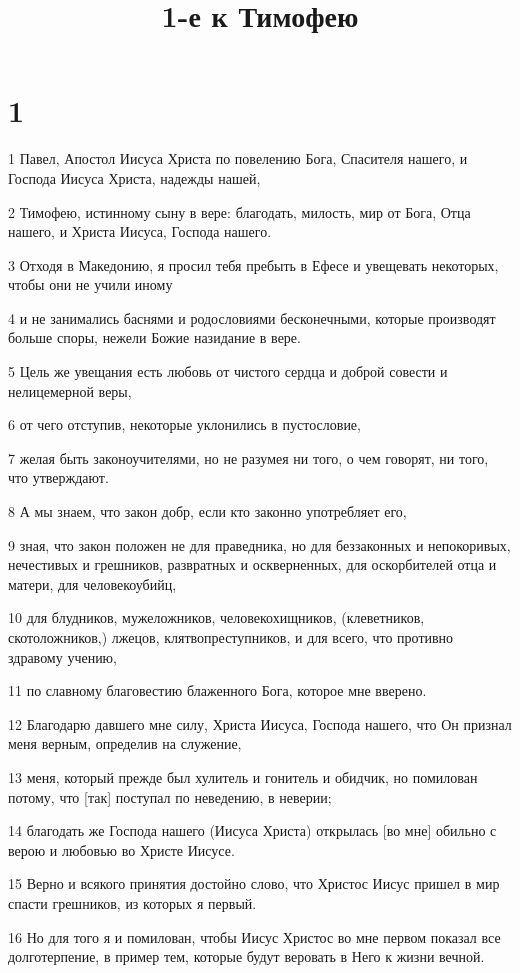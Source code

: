 

\title{1-е к Тимофею}


\chapter{1}

\par 1 Павел, Апостол Иисуса Христа по повелению Бога, Спасителя нашего, и Господа Иисуса Христа, надежды нашей,
\par 2 Тимофею, истинному сыну в вере: благодать, милость, мир от Бога, Отца нашего, и Христа Иисуса, Господа нашего.
\par 3 Отходя в Македонию, я просил тебя пребыть в Ефесе и увещевать некоторых, чтобы они не учили иному
\par 4 и не занимались баснями и родословиями бесконечными, которые производят больше споры, нежели Божие назидание в вере.
\par 5 Цель же увещания есть любовь от чистого сердца и доброй совести и нелицемерной веры,
\par 6 от чего отступив, некоторые уклонились в пустословие,
\par 7 желая быть законоучителями, но не разумея ни того, о чем говорят, ни того, что утверждают.
\par 8 А мы знаем, что закон добр, если кто законно употребляет его,
\par 9 зная, что закон положен не для праведника, но для беззаконных и непокоривых, нечестивых и грешников, развратных и оскверненных, для оскорбителей отца и матери, для человекоубийц,
\par 10 для блудников, мужеложников, человекохищников, (клеветников, скотоложников,) лжецов, клятвопреступников, и для всего, что противно здравому учению,
\par 11 по славному благовестию блаженного Бога, которое мне вверено.
\par 12 Благодарю давшего мне силу, Христа Иисуса, Господа нашего, что Он признал меня верным, определив на служение,
\par 13 меня, который прежде был хулитель и гонитель и обидчик, но помилован потому, что [так] поступал по неведению, в неверии;
\par 14 благодать же Господа нашего (Иисуса Христа) открылась [во мне] обильно с верою и любовью во Христе Иисусе.
\par 15 Верно и всякого принятия достойно слово, что Христос Иисус пришел в мир спасти грешников, из которых я первый.
\par 16 Но для того я и помилован, чтобы Иисус Христос во мне первом показал все долготерпение, в пример тем, которые будут веровать в Него к жизни вечной.
